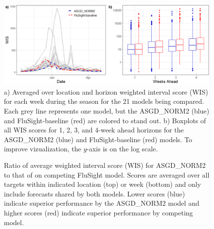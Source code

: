 \documentclass[ba]{imsart}
\theoremstyle{plain}
\theoremstyle{definition}
\theoremstyle{remark}
\begin{document}
\begin{supplement}
\begin{figure}[hbt!]
    \begin{adjustwidth}{-1.2cm}{-1.5cm}
    \includegraphics[scale = .54]{Images/wis_cover_sum.png}
    \caption{a) Averaged over location and horizon weighted interval score
    (WIS) for each week during the season for the 21 models being compared. 
    Each grey line represents one model, but the ASGD\_NORM2 (blue) and 
    FluSight-baseline (red) are colored to stand out.
    b) Boxplots of all WIS scores for 1, 2, 3, and 4-week ahead horizons 
    for the ASGD\_NORM2 (blue) and FluSight-baseline (red) models. 
    To improve vizualization, the $y$-axis
    is on the log scale.}
    \end{adjustwidth}
    \label{fig:wis_cover_sum}
\end{figure}

\begin{figure}[hbt!]
\begin{adjustwidth}{-1.2cm}{-1.5cm}
    \centering
    \end{adjustwidth}
    \caption{Ratio of average weighted interval score (WIS) for ASGD\_NORM2 
    to that of on competing FluSight model. Scores are averaged
    over all targets within indicated location (top) or week (bottom) and 
    only include forecasts shared by both models. Lower scores (blue) indicate
    superior performance by the ASGD\_NORM2 model and higher scores (red)
    indicate superior performance by competing model.}
    \label{fig:state_and_date_wis}
    

\end{figure}
\end{supplement}
\end{document}
